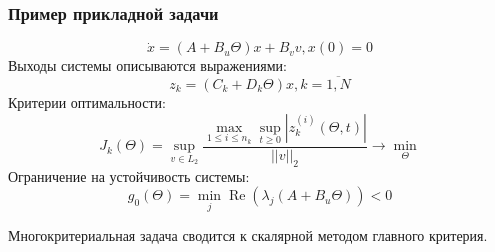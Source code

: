 \documentclass[aspectratio=1610]{beamer}
\DeclareMathOperator{\re}{Re}
\begin{document}
\begin{frame}
  \frametitle{Пример прикладной задачи}

    \begin{displaymath}
      \dot x = (A+B_u\Theta)x + B_v v, x(0)=0
    \end{displaymath}
    Выходы системы описываются выражениями:
    \begin{displaymath}
      z_k=(C_k+D_k\Theta)x,k=\overline{1,N}
    \end{displaymath}
    Критерии оптимальности:
    \begin{displaymath}
      J_k(\Theta)=\sup_{v\in L_2} \frac{\max_{1\leqslant i \leqslant n_k} \sup_{t\geqslant 0}|z_k^{(i)}(\Theta,t)|}{||v||_2} \rightarrow\min_{\Theta}
    \end{displaymath}
    Ограничение на устойчивость системы:
    \begin{displaymath}
      g_0(\Theta)=\min_{j}\re(\lambda_j(A+B_u\Theta)) < 0
    \end{displaymath}

    Многокритериальная задача сводится к скалярной методом главного критерия.

\end{frame}
\end{document}
